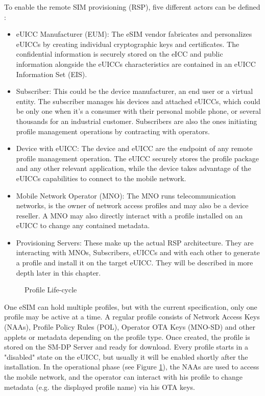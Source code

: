 To enable the remote SIM provisioning (\acrshort{RSP}), five different actors can be defined \parencite{Gerpott:eSIM, Meyer:eSIMOverview}:
\begin{itemize}
    \item eUICC Manufacturer (EUM): The eSIM vendor fabricates and personalizes eUICCs by creating individual cryptographic keys and certificates. The confidential information is securely stored on the eICC and public information alongside the eUICCs characteristics are contained in an eUICC Information Set (\acrshort{EIS}).
    \item Subscriber: This could be the device manufacturer, an end user or a virtual entity. The subscriber manages his devices and attached eUICCs, which could be only one when it's a consumer with their personal mobile phone, or several thousands for an industrial customer. Subscribers are also the ones initiating profile management operations by contracting with operators.
    \item Device with eUICC: The device and eUICC are the endpoint of any remote profile management operation. The eUICC securely stores the profile package and any other relevant application, while the device takes advantage of the eUICCs capabilities to connect to the mobile network.
    \item Mobile Network Operator (MNO): The MNO runs telecommunication networks, is the owner of network access profiles and may also be a device reseller. A MNO may also directly interact with a profile installed on an eUICC to change any contained metadata.
    \item Provisioning Servers: These make up the actual RSP architecture. They are interacting with MNOs, Subscribers, eUICCs and with each other to generate a profile and install it on the target eUICC. They will be described in more depth later in this chapter.
\end{itemize}



\begin{figure}[ht]
    \centering
    \fontsize{8}{10}\selectfont
    
    \caption{Profile Life-cycle}
    \label{fig:prof_lifecycle}
\end{figure}

One eSIM can hold multiple profiles, but with the current specification, only one profile may be active at a time. A regular profile consists of Network Access Keys (NAAs), Profile Policy Rules (POL), Operator OTA Keys (MNO-SD) and other applets or metadata depending on the profile type. Once created, the profile is stored on the SM-DP Server and ready for download. Every profile starts in a "disabled" state on the eUICC, but usually it will be enabled shortly after the installation. In the operational phase (see Figure \ref{fig:prof_lifecycle}), the NAAs are used to access the mobile network, and the operator can interact with his profile to change metadata (e.g. the displayed profile name) via his OTA keys. 

